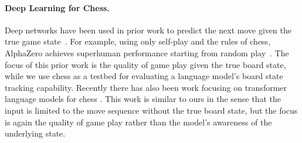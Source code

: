 \paragraph{Deep Learning for Chess.}
Deep networks have been used in prior work to predict the next move given the true game state~\cite{david16deepchess, Oshri2015PredictingMI}.
For example, using only self-play and the rules of chess, AlphaZero achieves superhuman performance starting from random play~\citep{silver18general}.
The focus of this prior work is the quality of game play given the true board state, while we use chess as a testbed for evaluating a language model's board state tracking capability.
Recently there has also been work focusing on transformer language models for chess \citep{presser2020chess,cheng2020chess,noever2020chess}. 
This work is similar to ours in the sense that the input is limited to the move sequence without the true board state, but the focus is again the quality of game play rather than the model's awareness of the underlying state. 


